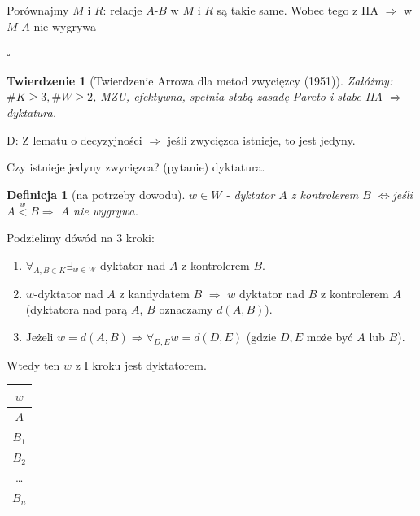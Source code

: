 \documentclass[12pt,a4paper]{article}
\theoremstyle{break}
\newtheorem{definition}{Definicja}[section]
\newtheorem{theorem}{Twierdzenie}[section]
\newcommand{\witw}{$\Leftrightarrow$}
\begin{document}
		Porównajmy $M$ i $R$: relacje $A$-$B$ w $M$ i $R$ są takie same. Wobec tego z IIA $\Rightarrow$ w $M$ $A$ nie wygrywa \faBolt
		\begin{flushright}$\square$\end{flushright}
		
		
		\begin{theorem}[Twierdzenie Arrowa dla metod zwycięzcy (1951)]
			Załóżmy: $\# K \geq 3, \#W\geq2$, MZU, efektywna, spełnia słabą zasadę Pareto i słabe IIA $\Rightarrow$ dyktatura.
		\end{theorem}
		
		D: Z lematu o decyzyjności $\Rightarrow$ jeśli zwycięzca istnieje, to jest jedyny.
		
		Czy istnieje jedyny zwycięzca? (pytanie) dyktatura.
		
		\begin{definition}[na potrzeby dowodu]
			$w\in W$ - dyktator $A$ z kontrolerem $B$ \witw \quad jeśli $A\overset{w}{<}B \Rightarrow$ $A$ nie wygrywa.
		\end{definition}
		
		Podzielimy dówód na 3 kroki:
		
		\begin{enumerate}[I krok - ]
			\item $\forall_{A,B \in K} \exists_{w\in W}$ dyktator nad $A$ z kontrolerem $B$.
			
			\item $w$-dyktator nad $A$ z kandydatem $B$ $\Rightarrow$ $w$ dyktator nad $B$ z kontrolerem $A$ (dyktatora nad parą $A$, $B$ oznaczamy $d(A,B)$).
			
			\item Jeżeli $w=d(A,B) \Rightarrow \forall_{D,E} w = d(D,E)$ (gdzie $D,E$ może być $A$ lub $B$).
		\end{enumerate}
		
		
		
		Wtedy ten $w$ z I kroku jest dyktatorem.
		\begin{tabular}{|c|}\hline
			$w$ \\\hline
			$A$ \\\hline
			$B_1$ \\\hline
			$B_2$ \\\hline
			\dots \\\hline
			$B_n$ \\\hline
		\end{tabular}
		
\end{document}
